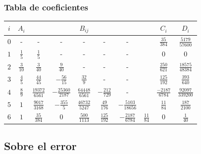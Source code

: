 \documentclass[12pt]{beamer}
\begin{document}
\begin{frame}
\frametitle{Tabla de coeficientes}
\begin{table}
\centering
\renewcommand*{\arraystretch}{0.9}
\begin{tabular}{| c | c | c c c c c  c | c | c |}
\hline
$i$ & $A_{i}$ & & & $B_{ij}$ & & & & $C_{i}$ & $D_{i}$ \\ \hline
$\scriptstyle 0$ & - & - & - & - & - & - & & $\frac{35}{384}$ & $\frac{5179}{57600}$ \\ \hline
$\scriptstyle 1$ & $\frac{1}{5}$ & $\frac{1}{5}$ & - & - & - & - & & $\scriptstyle 0$ & $\scriptstyle 0$ \\ \hline
$\scriptstyle 2$ & $\frac{3}{10}$ & $\frac{3}{40}$ & $\frac{9}{40}$ & - & - & - & & $\frac{250}{621}$ & $\frac{18575}{48384}$ \\ \hline
$\scriptstyle 3$ & $\frac{4}{5}$ & $\frac{44}{45}$ & $-\frac{56}{15}$ & $\frac{32}{9}$ & - & - & & $\frac{125}{192}$ & $\frac{393}{640}$ \\ \hline
$\scriptstyle 4$ & $\frac{8}{9}$ & $\frac{19372}{6561}$ & $-\frac{25360}{2187}$ & $\frac{64448}{6561}$ & $-\frac{212}{729}$ & - &  &$\frac{-2187}{6784}$ & $\frac{92097}{339200}$ \\ \hline
$\scriptstyle 5$ & $\scriptstyle 1$ & $\frac{9017}{3168}$ & $-\frac{355}{5}$ & $\frac{46732}{5247}$ & $\frac{49}{176}$ & $-\frac{5103}{18656}$ & & $\frac{11}{84}$ & $\frac{187}{2100}$ \\ \hline
$\scriptstyle 6$ & $\scriptstyle 1$ & $\frac{35}{384}$ & $\scriptstyle 0$ & $\frac{500}{1113}$ & $\frac{125}{192}$ & $-\frac{2187}{6784}$ &  $\frac{11}{84}$ & $\scriptstyle 0$ & $\frac{1}{40}$ \\ \hline
\end{tabular}
\end{table}
\end{frame}

\subsection{Sobre el error}
\end{document}
